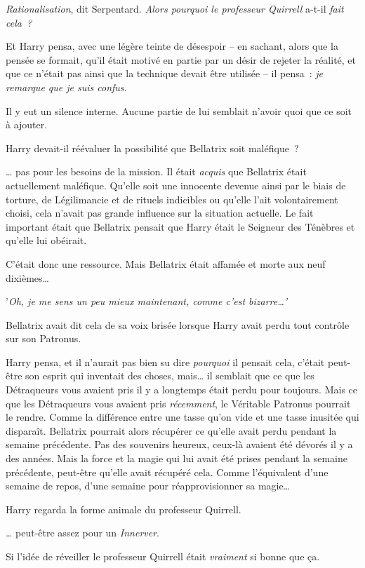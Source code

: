 \emph{Rationalisation}, dit Serpentard. \emph{Alors pourquoi le professeur Quirrell} a-t-il \emph{fait cela~?}

Et Harry pensa, avec une légère teinte de désespoir -- en sachant, alors que la pensée se formait, qu'il était motivé en partie par un désir de rejeter la réalité, et que ce n'était pas ainsi que la technique devait être utilisée -- il pensa~: \emph{je remarque que je suis confus.}

Il y eut un silence interne. Aucune partie de lui semblait n'avoir quoi que ce soit à ajouter.

Harry devait-il réévaluer la possibilité que Bellatrix soit maléfique~?

… pas pour les besoins de la mission. Il était \emph{acquis} que Bellatrix était actuellement maléfique. Qu'elle soit une innocente devenue ainsi par le biais de torture, de Légilimancie et de rituels indicibles ou qu'elle l'ait volontairement choisi, cela n'avait pas grande influence sur la situation actuelle. Le fait important était que Bellatrix pensait que Harry était le Seigneur des Ténèbres et qu'elle lui obéirait.

C'était donc une ressource. Mais Bellatrix était affamée et morte aux neuf dixièmes…

'\emph{Oh, je me sens un peu mieux maintenant, comme c'est bizarre…'}

Bellatrix avait dit cela de sa voix brisée lorsque Harry avait perdu tout contrôle sur son Patronus.

Harry pensa, et il n'aurait pas bien su dire \emph{pourquoi} il pensait cela, c'était peut-être son esprit qui inventait des choses, mais… il semblait que ce que les Détraqueurs vous avaient pris il y a longtemps était perdu pour toujours. Mais ce que les Détraqueurs vous avaient pris \emph{récemment}, le Véritable Patronus pourrait le rendre. Comme la différence entre une tasse qu'on vide et une tasse inusitée qui disparaît. Bellatrix pourrait alors récupérer ce qu'elle avait perdu pendant la semaine précédente. Pas des souvenirs heureux, ceux-là avaient été dévorés il y a des années. Mais la force et la magie qui lui avait été prises pendant la semaine précédente, peut-être qu'elle avait récupéré cela. Comme l'équivalent d'une semaine de repos, d'une semaine pour réapprovisionner sa magie…

Harry regarda la forme animale du professeur Quirrell.

… peut-être assez pour un \emph{Innerver}.

Si l'idée de réveiller le professeur Quirrell était \emph{vraiment} si bonne que ça.

